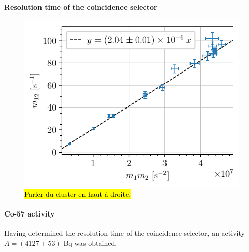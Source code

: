 \paragraph{Resolution time of the coincidence selector}
\begin{figure}[htbp]
    \centering
    \includegraphics[scale=1]{figures/twotheta_cs137.pdf}
    \caption{\hl{Parler du cluster en haut à droite.}}
    \label{fig:twotheta_cs137}
\end{figure}

\paragraph{Co-57 activity}
Having determined the resolution time of the coincidence selector, an activity $A= (4127 \pm 53)$ Bq was obtained.